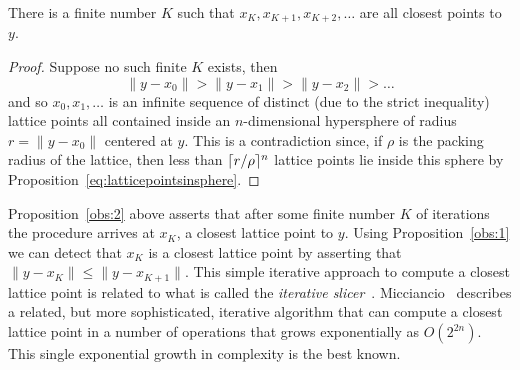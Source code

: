 \documentclass[final,leqno]{siamltex}
\begin{document}

 \begin{proposition}\label{obs:2}
 There is a finite number $K$ such that $x_K, x_{K+1}, x_{K+2}, \dots$ are all closest points to $y$.
 \end{proposition}
 \begin{proof}
Suppose no such finite $K$ exists, then
\[
\|y - x_0\| >  \|y - x_1\| > \|y - x_2\| > \dots
\]
and so $x_0,x_1,\dots$ is an infinite sequence of distinct (due to the strict inequality) lattice points  all contained inside an $n$-dimensional hypersphere of radius $r = \|y - x_0\|$ centered at $y$.  This is a contradiction since, if $\rho$ is the packing radius of the lattice, then less than $\lceil r/\rho \rceil^n$ lattice points lie inside this sphere by Proposition~\ref{eq:latticepointsinsphere}. 
\end{proof}

Proposition~\ref{obs:2} above asserts that after some finite number $K$ of iterations the procedure arrives at $x_K$, a closest lattice point to $y$.  Using Proposition~\ref{obs:1} we can detect that $x_K$ is a closest lattice point by asserting that $\|y - x_K\| \leq \| y - x_{K+1} \|$.
This simple iterative approach to compute a closest lattice point is related to what is called the \emph{iterative slicer}~\cite{Shalvi_iterativeslicer_2009}.  Micciancio~\cite{Micciancio09adeterministic} describes a related, but more sophisticated, iterative algorithm that can compute a closest lattice point in a number of operations that grows exponentially as $O(2^{2 n})$.  This single exponential growth in complexity is the best known.  %
\end{document}
